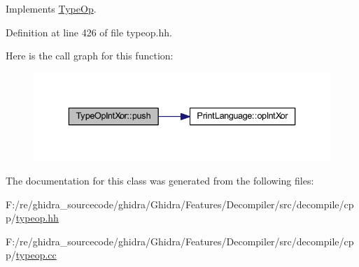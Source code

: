 Implements \mbox{\hyperlink{class_type_op_ac9c9544203ed74dabe6ac662b653b2af}{Type\+Op}}.



Definition at line 426 of file typeop.\+hh.

Here is the call graph for this function\+:
\nopagebreak
\begin{figure}[H]
\begin{center}
\leavevmode
\includegraphics[width=336pt]{class_type_op_int_xor_a8ee9baa6e405df5fd4fe9e6a5b4ccf34_cgraph}
\end{center}
\end{figure}


The documentation for this class was generated from the following files\+:\begin{DoxyCompactItemize}
\item 
F\+:/re/ghidra\+\_\+sourcecode/ghidra/\+Ghidra/\+Features/\+Decompiler/src/decompile/cpp/\mbox{\hyperlink{typeop_8hh}{typeop.\+hh}}\item 
F\+:/re/ghidra\+\_\+sourcecode/ghidra/\+Ghidra/\+Features/\+Decompiler/src/decompile/cpp/\mbox{\hyperlink{typeop_8cc}{typeop.\+cc}}\end{DoxyCompactItemize}
